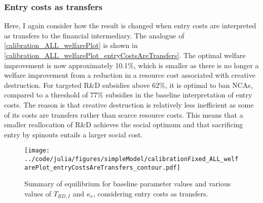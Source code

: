 \documentclass[11pt,english]{article}
\theoremstyle{definition}
\begin{document}
\subsubsection{Entry costs as transfers}

Here, I again consider how the result is changed when entry costs are interpreted as transfers to the financial intermediary. The analogue of \autoref{calibration_ALL_welfarePlot} is shown in \autoref{calibration_ALL_welfarePlot_entryCostsAreTransfers}. The optimal welfare improvement is now approximately 10.1\%, which is smaller as there is no longer a welfare improvement from a reduction in a resource cost associated with creative destruction. For targeted R\&D subsidies above 62\%, it is optimal to ban NCAs, compared to a threshold of 77\% subsidies in the baseline interpretation of entry costs. The reason is that creative destruction is relatively less inefficient as some of its costs are transfers rather than scarce resource costs. This means that a smaller reallocation of R\&D achieves the social optimum and that sacrificing entry by spinouts entails a larger social cost. 

\begin{figure}[]
	\centering
	\texttt{[image: ../code/julia/figures/simpleModel/calibrationFixed\_ALL\_welfarePlot\_entryCostsAreTransfers\_contour.pdf]}
	\caption{Summary of equilibrium for baseline parameter values and various values of $T_{RD,I}$ and $\kappa_c$, considering entry costs as transfers.}
	\label{calibration_ALL_welfarePlot_entryCostsAreTransfers}
\end{figure}
\end{document}
